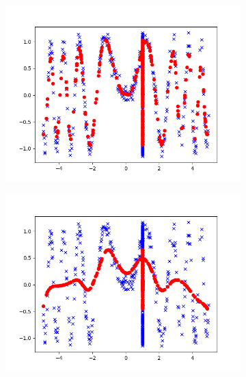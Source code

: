 \begin{answer}
\begin{figure}[htb]
\begin{subfigure}{0.5\linewidth}
    \end{subfigure}
    \begin{subfigure}{0.5\linewidth}
        \centering
        \includegraphics[width=\linewidth]{tex/tau_0.1.png}
    \end{subfigure}
    \begin{subfigure}{0.5\linewidth}
        \centering
        \includegraphics[width=\linewidth]{tex/tau_0.5.png}
    \end{subfigure}
    

\end{figure}
\end{answer}

